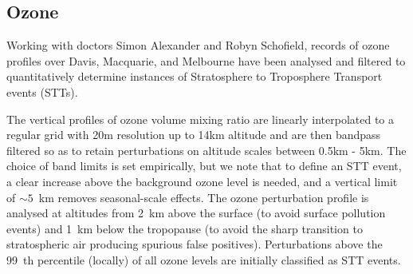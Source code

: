 
\subsection{Ozone}
Working with doctors Simon Alexander and Robyn Schofield, records of ozone profiles over Davis, Macquarie, and Melbourne have been analysed and filtered to quantitatively determine instances of Stratosphere to Troposphere Transport events (STTs).

The vertical profiles of ozone volume mixing ratio are linearly interpolated to a regular grid with 20m resolution up to 14km altitude and are then bandpass filtered so as to retain perturbations on altitude scales between 0.5km - 5km. The choice of band limits is set empirically, but we note that to define an STT event, a clear increase above the background ozone level is needed, and a vertical limit of $\sim 5$~km removes seasonal-scale effects. The ozone perturbation profile is analysed at altitudes from 2~km above the surface (to avoid surface pollution events) and 1~km below the tropopause (to avoid the sharp transition to stratospheric air producing spurious false positives). Perturbations above the 99~th percentile (locally) of all ozone levels are initially classified as STT events.

  
  
  
  